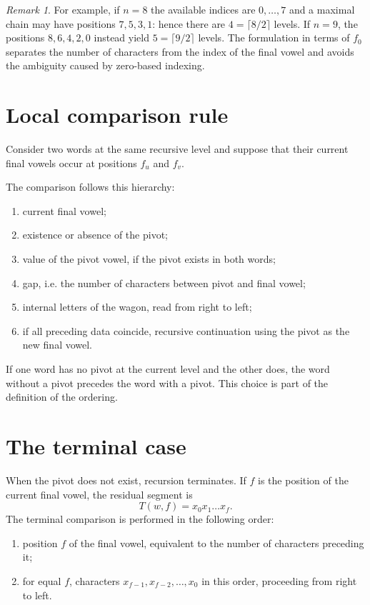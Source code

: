 \documentclass[11pt,a4paper]{article}
\theoremstyle{definition}
\theoremstyle{remark}
\newtheorem{remark}[theorem]{Remark}
\begin{document}
\begin{remark}
For example, if $n=8$ the available indices are $0,\dots,7$ and a maximal chain may have positions $7,5,3,1$: hence there are $4=\lceil8/2\rceil$ levels. If $n=9$, the positions $8,6,4,2,0$ instead yield $5=\lceil9/2\rceil$ levels. The formulation in terms of $f_0$ separates the number of characters from the index of the final vowel and avoids the ambiguity caused by zero-based indexing.
\end{remark}

\section{Local comparison rule}

Consider two words at the same recursive level and suppose that their current final vowels occur at positions $f_u$ and $f_v$.

The comparison follows this hierarchy:
\begin{enumerate}[label=\arabic*.]
  \item current final vowel;
  \item existence or absence of the pivot;
  \item value of the pivot vowel, if the pivot exists in both words;
  \item gap, i.e. the number of characters between pivot and final vowel;
  \item internal letters of the wagon, read from right to left;
  \item if all preceding data coincide, recursive continuation using the pivot as the new final vowel.
\end{enumerate}

If one word has no pivot at the current level and the other does, the word without a pivot precedes the word with a pivot. This choice is part of the definition of the ordering.

\section{The terminal case}

When the pivot does not exist, recursion terminates. If $f$ is the position of the current final vowel, the residual segment is
\[
  T(w,f)=x_0x_1\dots x_f.
\]
The terminal comparison is performed in the following order:
\begin{enumerate}[label=\arabic*.]
  \item position $f$ of the final vowel, equivalent to the number of characters preceding it;
  \item for equal $f$, characters $x_{f-1},x_{f-2},\dots,x_0$ in this order, proceeding from right to left.
\end{enumerate}
\end{document}
